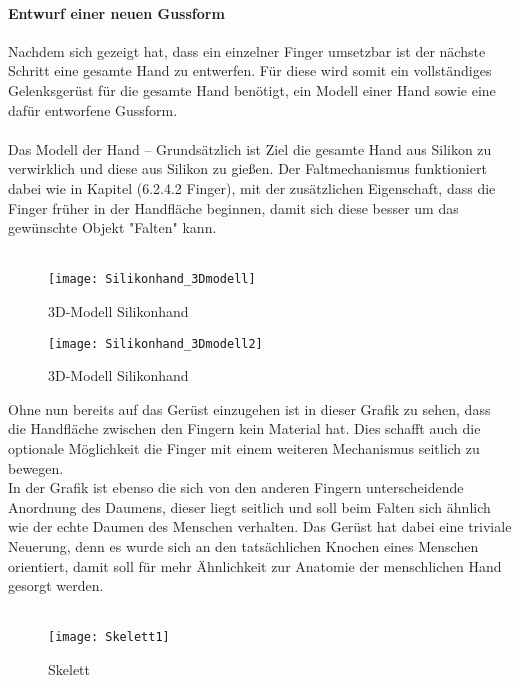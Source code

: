 \documentclass[titlepage,12pt,twoside]{article}
\begin{document}
\paragraph{Entwurf einer neuen Gussform}
\hfill \break
\hfill \break
Nachdem sich gezeigt hat, dass ein einzelner Finger umsetzbar ist der nächste Schritt eine gesamte Hand zu entwerfen. Für diese wird somit ein vollständiges Gelenksgerüst für die gesamte Hand benötigt, ein Modell einer Hand sowie eine dafür entworfene 
Gussform. \\
\\
Das Modell der Hand – Grundsätzlich ist Ziel die gesamte Hand aus Silikon zu verwirklich und diese aus Silikon zu gießen. Der Faltmechanismus funktioniert dabei wie in Kapitel (6.2.4.2 Finger), mit der zusätzlichen Eigenschaft, dass die Finger früher 
in der Handfläche beginnen, damit sich diese besser um das gewünschte Objekt "Falten" kann. \\
\\
\begin{figure}[H]
	\begin{center}
		\scalebox{1.2}
		{\texttt{[image: Silikonhand\_3Dmodell]}}
		\caption{3D-Modell Silikonhand}
		\label{fig:Silikonhand_3Dmodell}			
	\end{center}
\end{figure}
\begin{figure}[H]
	\begin{center}
		\scalebox{1.2}
		{\texttt{[image: Silikonhand\_3Dmodell2]}}
		\caption{3D-Modell Silikonhand}
		\label{fig:Silikonhand_3Dmodell2}			
	\end{center}
\end{figure}
\hfill \break
Ohne nun bereits auf das Gerüst einzugehen ist in dieser Grafik zu sehen, dass die Handfläche zwischen den Fingern kein Material hat. Dies schafft auch die optionale Möglichkeit die Finger mit einem weiteren Mechanismus seitlich zu bewegen. \\
In der Grafik ist ebenso die sich von den anderen Fingern unterscheidende Anordnung des Daumens, dieser liegt seitlich und soll beim Falten sich ähnlich wie der echte Daumen des Menschen verhalten.
Das Gerüst hat dabei eine triviale Neuerung, denn es wurde sich an den tatsächlichen Knochen eines Menschen orientiert, damit soll für mehr Ähnlichkeit zur Anatomie der menschlichen Hand gesorgt werden. \\
\\
\begin{figure}[H]
	\begin{center}
		\scalebox{1.2}
		{\texttt{[image: Skelett1]}}
		\caption{Skelett}
		\label{fig:Skelett1}			
	\end{center}
\end{figure}
\end{document}
